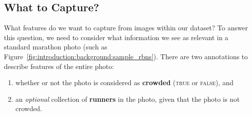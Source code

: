 
\clearpage

\subsection{What to Capture?}
\label{sec:dataset:architecture:what_to_capture}

What features do we want to capture from images within our dataset? To answer this question, we need to consider what information we see as relevant in a standard marathon photo (such as Figure~\ref{fig:introduction:background:sample_rbns}). There are two annotations to describe features of the entire photo:

\begin{enumerate}
  \item whether or not the photo is considered as \textbf{crowded} (\textsc{true} or \textsc{false}), and
  \item an \textit{optional} collection of \textbf{runners} in the photo, given that the photo is not crowded.
\end{enumerate}

